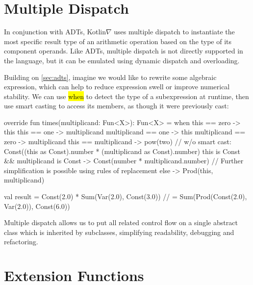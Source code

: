 \documentclass[12pt,initial,twoside,maitrise]{dms}
\newcommand{\inline}[1]{%
    \begingroup%
    \sethlcolor{slightgray}%
    \hl{\ttfamily\footnotesize #1}%
    \endgroup
}
\numberwithin{equation}{section}
\numberwithin{table}{chapter}
\numberwithin{figure}{chapter}
\begin{document}
\section{Multiple Dispatch}\label{sec:multiple-dispatch}

In conjunction with ADTs, Kotlin$\nabla$ uses multiple dispatch to instantiate the most specific result type of an arithmetic operation based on the type of its component operands. Like ADTs, multiple dispatch is not directly supported in the language, but it can be emulated using dynamic dispatch and overloading.

Building on \autoref{sec:adts}, imagine we would like to rewrite some algebraic expression, which can help to reduce expression swell or improve numerical stability. We can use \inline{when} to detect the type of a subexpression at runtime, then use smart casting to access its members, as though it were previously cast:

\begin{kotlinlisting}
override fun times(multiplicand: Fun<X>): Fun<X> =
    when {
        this == zero -> this
        this == one -> multiplicand
        multiplicand == one -> this
        multiplicand == zero -> multiplicand
        this == multiplicand -> pow(two)
        // w/o smart cast: Const((this as Const).number * (multiplicand as Const).number)
        this is Const && multiplicand is Const -> Const(number * multiplicand.number)
        // Further simplification is possible using rules of replacement
        else -> Prod(this, multiplicand)
    }

val result = Const(2.0) * Sum(Var(2.0), Const(3.0))
//         = Sum(Prod(Const(2.0), Var(2.0)), Const(6.0))
\end{kotlinlisting}
%
Multiple dispatch allows us to put all related control flow on a single abstract class which is inherited by subclasses, simplifying readability, debugging and refactoring.

\section{Extension Functions}\label{sec:extension-functions}
\end{document}
